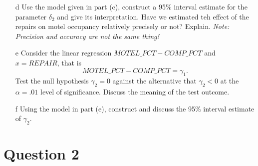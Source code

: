 \documentclass[xcolor={dvipsnames}]{beamer}
\begin{document}
\begin{frame}[allowframebreaks]{3.6}
\begin{itemize}
		\item[d] Use the model given in part (c), construct a 95\% interval estimate for the parameter $\delta_2$ and give its interpretation. Have we estimated teh effect of the repairs on motel occupancy relatively precisely or not? Explain. \textit{Note: Precision and accuracy are not the same thing!}
		
		\item[e] Consider the linear regression $MOTEL\_PCT - COMP\_PCT$ and $x = REPAIR$, that is $$MOTEL\_PCT - COMP\_PCT = \gamma_1.$$ Test the null hypothesis $\gamma_2 = 0$ against the alternative that $\gamma_2 < 0$ at the $\alpha = .01$ level of significance. Discuss the meaning of the test outcome.
		
		\item[f] Using the model in part (e), construct and discuss the 95\% interval estimate of $\gamma_2$.


	\end{itemize}

\end{frame}



\section{Question 2}
\end{document}
